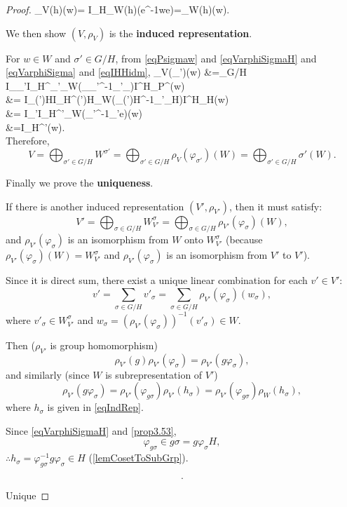 \documentclass[12pt, letterpaper]{article}
\newcommand{\red}[1]{{\color{red} #1}}
\newenvironment{eqlong}{\equation\aligned}{\endaligned\endequation}
\theoremstyle{definition}
\theoremstyle{remark}
\theoremstyle{definition}
\theoremstyle{plain}
\numberwithin{equation}{section}
\begin{document}
\begin{proof}
		\begin{eqlong}		
			\rho_V(h)(w)=
			I_H\circ\rho_W(h)(e^{-1}we)=\rho_W(h)(w).
		\end{eqlong}
		
		We then show $(V,\rho_V)$ is the \textbf{induced representation}.
		
		For $w\in W$ and $\sigma'\in G/H$,
		from \eqref{eqPsigmaw} and \eqref{eqVarphiSigmaH} and \eqref{eqVarphiSigma} and \eqref{eqIHHidm},
		\begin{eqlong}
			\rho_V(\varphi_{\sigma'})(w) 
			&=\sum_{\sigma\in G/H} I_{\varphi_{\sigma'}\sigma}\circ I_{H}^{\varphi_{\sigma'}\sigma}\circ \rho_W(\varphi_{\varphi_{\sigma'}\sigma}^{-1}\varphi_{\sigma'}\varphi_{\sigma})\circ I^{H}_{\sigma}\circ P^\sigma(w)\\
			&= I_{\varphi(\sigma')H}\circ I_{H}^{\varphi(\sigma')H}\circ \rho_W(\varphi_{\varphi(\sigma')H}^{-1}\varphi_{\sigma'}\varphi_{H})\circ I^{H}_{H}(w)\\
			&= I_{\sigma'}\circ I_{H}^{\sigma'}\circ \rho_W(\varphi_{\sigma'}^{-1}\varphi_{\sigma'}e)(w)\\
			&=I_{H}^{\sigma'}(w).\\
		\end{eqlong}
		 Therefore,
		\[V=\bigoplus_{\sigma'\in G/H}W^{\sigma'}=\bigoplus_{\sigma'\in G/H}\rho_V(\varphi_{\sigma'})(W)=\bigoplus_{\sigma'\in G/H}\sigma'(W). \]
		
		Finally we prove the \textbf{uniqueness}.
		
		If there is another induced representation $(V',\rho_{V'})$, then it must satisfy:
		\[V'=\bigoplus_{\sigma\in G/H} W^{\sigma}_{V'}=\bigoplus_{\sigma\in G/H}\rho_{V'}(\varphi_\sigma)(W),\]
		and $\rho_{V'}(\varphi_\sigma)$ is an isomorphism from $W$ onto $W^{\sigma}_{V'}$
		(because $\rho_{V'}(\varphi_\sigma)(W)=W^{\sigma}_{V'}$ and $\rho_{V'}(\varphi_\sigma)$
		is an isomorphism from $V'$ to $V'$).
		
		Since it is direct sum, there exist a unique linear combination for each $v'\in V'$:
		\[ v' = \sum_{\sigma\in G/H} v'_\sigma=\sum_{\sigma\in G/H} \rho_{V'}(\varphi_\sigma)(w_\sigma),\]
		where $v'_\sigma\in W^{\sigma}_{V'}$ and $w_\sigma=(\rho_{V'}(\varphi_\sigma))^{-1}(v'_\sigma)\in W$.
		
		Then ($\rho_{V'}$ is group homomorphism)
		\[\rho_{V'}(g)\rho_{V'}(\varphi_\sigma)= \rho_{V'}(g\varphi_\sigma),\]
		and similarly (since $W$ is subrepresentation of $V'$)
		\[ \rho_{V'}(g\varphi_\sigma)=\rho_{V'}(\varphi_{g\sigma})\rho_{V'}({h_\sigma})
		=\rho_{V'}(\varphi_{g\sigma})\rho_{W}({h_\sigma}),\]
		where $h_\sigma$ is given in \eqref{eqIndRep}.
		
		Since \eqref{eqVarphiSigmaH} and \autoref{prop3.53},
		\[\varphi_{g\sigma}\in g\sigma=g\varphi_\sigma H,\]
		$\therefore h_\sigma=\varphi_{g\sigma}^{-1}g\varphi_\sigma\in H$ (\autoref{lemCosetToSubGrp}).
		
		\[.\]
		
		\red{Unique}
		
	\end{proof}
	
\end{document}
